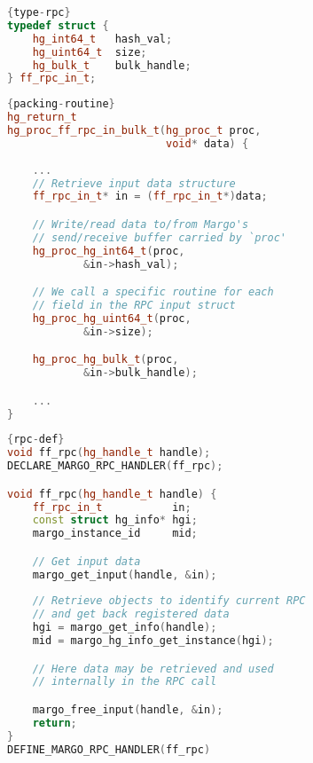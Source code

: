 \noindent\begin{minipage}{.40\textwidth}
\begin{lstlisting}[caption=RPC type definition.,language=C++, style=mystyle, label=type-rpc]{type-rpc}
typedef struct {
    hg_int64_t   hash_val;
    hg_uint64_t  size;
    hg_bulk_t    bulk_handle;
} ff_rpc_in_t;
\end{lstlisting}
\end{minipage}\hfill
\begin{minipage}{.48\textwidth}
\begin{lstlisting}[caption=Packing routine definition. Allows the Margo framework to manage data from/to the network buffer used internally to ship data during RPC calls. Each of the type-specific routines allows data copies which are aware of the size of data to be packed/unpacked.,language=C++, style=mystyle, label=packing-routine]{packing-routine}
hg_return_t
hg_proc_ff_rpc_in_bulk_t(hg_proc_t proc,
                         void* data) {
    
    ...
    // Retrieve input data structure
    ff_rpc_in_t* in = (ff_rpc_in_t*)data;

    // Write/read data to/from Margo's
    // send/receive buffer carried by `proc'
    hg_proc_hg_int64_t(proc,
            &in->hash_val);

    // We call a specific routine for each
    // field in the RPC input struct
    hg_proc_hg_uint64_t(proc,
            &in->size);

    hg_proc_hg_bulk_t(proc,
            &in->bulk_handle);

    ...
}
\end{lstlisting}
\end{minipage}
\begin{center}
\vspace{-0.1cm}
\begin{minipage}{0.55\textwidth}
\begin{lstlisting}[caption=RPC declaration and definition,language=C++, style=mystyle, label=rpc-def]{rpc-def}
void ff_rpc(hg_handle_t handle);
DECLARE_MARGO_RPC_HANDLER(ff_rpc);

void ff_rpc(hg_handle_t handle) {
    ff_rpc_in_t           in;
    const struct hg_info* hgi;
    margo_instance_id     mid;

    // Get input data
    margo_get_input(handle, &in);
    
    // Retrieve objects to identify current RPC
    // and get back registered data
    hgi = margo_get_info(handle);
    mid = margo_hg_info_get_instance(hgi);

    // Here data may be retrieved and used
    // internally in the RPC call

    margo_free_input(handle, &in);
    return;
}
DEFINE_MARGO_RPC_HANDLER(ff_rpc)
\end{lstlisting}
\end{minipage}
\end{center}

